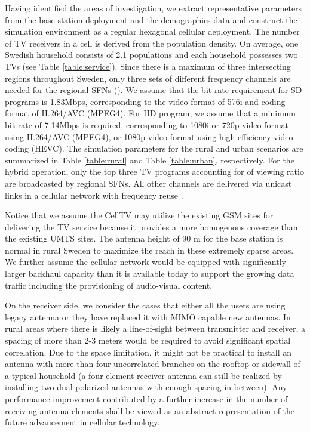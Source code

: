 \documentclass[journal]{IEEEtran}
\begin{document}
Having identified the areas of investigation, we extract representative parameters from the base station deployment and the demographics data and construct the simulation environment as a regular hexagonal cellular deployment. The number of TV receivers in a cell is derived from the population density. On average, one Swedish household consists of 2.1 populations and each household possesses two TVs (see Table \ref{table:service}). Since there is a maximum of three intersecting regions throughout Sweden, only three sets of different frequency channels are needed for the regional SFNs (). We assume that the bit rate requirement for SD programs is 1.83Mbps, corresponding to the video format of 576i and coding format of H.264/AVC (MPEG4). For HD program, we assume that a minimum bit rate of 7.14Mbps is required, corresponding to 1080i or 720p video format using H.264/AVC (MPEG4), or 1080p video format using high efficiency video coding (HEVC). The simulation parameters for the rural and urban scenarios are summarized in Table \ref{table:rural} and Table \ref{table:urban}, respectively. For the hybrid operation, only the top three TV programs accounting for  of viewing ratio are broadcasted by regional SFNs. All other channels are delivered via unicast links in a cellular network with frequency reuse .

Notice that we assume the CellTV may utilize the existing GSM sites for delivering the TV service because it provides a more homogenous coverage than the existing UMTS sites. The antenna height of 90 m for the base station is normal in rural Sweden to maximize the reach in these extremely sparse areas. We further assume the cellular network would be equipped with significantly larger backhaul capacity than it is available today to support the growing data traffic including the provisioning of audio-visual content.

On the receiver side, we consider the cases that either all the users are using legacy antenna or they have replaced it with MIMO capable new antennas. In rural areas where there is likely a line-of-sight between transmitter and receiver, a spacing of more than 2-3 meters \cite{MIMO} would be required to avoid significant spatial correlation. Due to the space limitation, it might not be practical to install an antenna with more than four uncorrelated branches on the rooftop or sidewall of a typical household (a four-element receiver antenna can still be realized by installing two dual-polarized antennas with enough spacing in between). Any performance improvement contributed by a further increase in the number of receiving antenna elements shall be viewed as an abstract representation of the future advancement in cellular technology.
\end{document}
